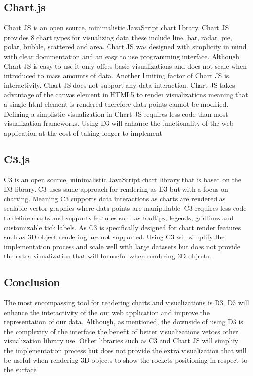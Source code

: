 \documentclass[onecolumn, draftclsnofoot,10pt, compsoc]{IEEEtran}
\begin{document}
\subsection{Chart.js}
Chart JS is an open source, minimalistic JavaScript chart library. Chart JS provides 8 chart types for visualizing data these include line, bar, radar, pie, polar, bubble, scattered and area. Chart JS was designed with simplicity in mind with clear documentation and an easy to use programming interface. Although Chart JS is easy to use it only offers basic visualizations and does not scale when introduced to mass amounts of data. Another limiting factor of Chart JS is interactivity. Chart JS does not support any data interaction. Chart JS takes advantage of the canvas element in HTML5 to render visualizations meaning that a single html element is rendered therefore data points cannot be modified. Defining a simplistic visualization in Chart JS requires less code than most visualization frameworks. Using D3 will enhance the functionality of the web application at the cost of taking longer to implement. 
\subsection{C3.js}
C3 is an open source, minimalistic JavaScript chart library that is based on the D3 library. C3 uses same approach for rendering as D3 but with a focus on charting. Meaning C3 supports data interactions as charts are rendered as scalable vector graphics where data points are manipulable. C3 requires less code to define charts and supports features such as tooltips, legends, gridlines and customizable tick labels. As C3 is specifically designed for chart render features such as 3D object rendering are not supported. Using C3 will simplify the implementation process and scale well with large datasets but does not provide the extra visualization that will be useful when rendering 3D objects. 
\subsection{Conclusion}
The most encompassing tool for rendering charts and visualizations is D3. D3 will enhance the interactivity of the our web application and improve the representation of our data. Although, as mentioned, the downside of using D3 is the complexity of the interface the benefit of better visualizations vetoes other visualization library use. Other libraries such as C3 and Chart JS will simplify the implementation process but does not provide the extra visualization that will be useful when rendering 3D objects to show the rockets positioning in respect to the surface. 
\end{document}
